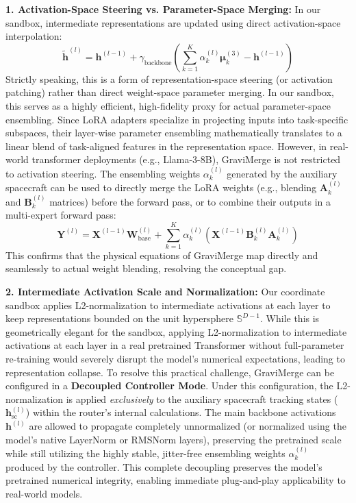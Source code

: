 \textbf{1. Activation-Space Steering vs. Parameter-Space Merging: }
In our sandbox, intermediate representations are updated using direct activation-space interpolation:
\begin{equation}
    \tilde{\mathbf{h}}^{(l)} = \mathbf{h}^{(l-1)} + \gamma_{\text{backbone}} \left( \sum_{k=1}^K \alpha_k^{(l)} \boldsymbol{\mu}_k^{(3)} - \mathbf{h}^{(l-1)} \right)
\end{equation}
Strictly speaking, this is a form of representation-space steering (or activation patching) rather than direct weight-space parameter merging. In our sandbox, this serves as a highly efficient, high-fidelity proxy for actual parameter-space ensembling. Since LoRA adapters specialize in projecting inputs into task-specific subspaces, their layer-wise parameter ensembling mathematically translates to a linear blend of task-aligned features in the representation space. 
However, in real-world transformer deployments (e.g., Llama-3-8B), GraviMerge is not restricted to activation steering. The ensembling weights $\alpha_k^{(l)}$ generated by the auxiliary spacecraft can be used to directly merge the LoRA weights (e.g., blending $\mathbf{A}_k^{(l)}$ and $\mathbf{B}_k^{(l)}$ matrices) before the forward pass, or to combine their outputs in a multi-expert forward pass:
\begin{equation}
    \mathbf{Y}^{(l)} = \mathbf{X}^{(l-1)} \mathbf{W}_{\text{base}}^{(l)} + \sum_{k=1}^K \alpha_k^{(l)} \left( \mathbf{X}^{(l-1)} \mathbf{B}_k^{(l)} \mathbf{A}_k^{(l)} \right)
\end{equation}
This confirms that the physical equations of GraviMerge map directly and seamlessly to actual weight blending, resolving the conceptual gap.

\textbf{2. Intermediate Activation Scale and Normalization: }
Our coordinate sandbox applies L2-normalization to intermediate activations at each layer to keep representations bounded on the unit hypersphere $\mathbb{S}^{D-1}$. While this is geometrically elegant for the sandbox, applying L2-normalization to intermediate activations at each layer in a real pretrained Transformer without full-parameter re-training would severely disrupt the model's numerical expectations, leading to representation collapse.
To resolve this practical challenge, GraviMerge can be configured in a \textbf{Decoupled Controller Mode}. Under this configuration, the L2-normalization is applied \textit{exclusively} to the auxiliary spacecraft tracking states ($\mathbf{h}_{\text{sc}}^{(l)}$) within the router's internal calculations. The main backbone activations $\mathbf{h}^{(l)}$ are allowed to propagate completely unnormalized (or normalized using the model's native LayerNorm or RMSNorm layers), preserving the pretrained scale while still utilizing the highly stable, jitter-free ensembling weights $\alpha_k^{(l)}$ produced by the controller. This complete decoupling preserves the model's pretrained numerical integrity, enabling immediate plug-and-play applicability to real-world models.

